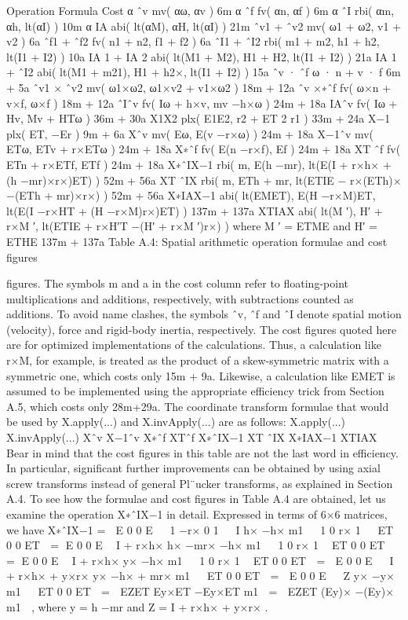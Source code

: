Operation Formula Cost α ˆv mv( αω, αv ) 6m α ˆf fv( αn, αf ) 6m α ˆI rbi( αm, αh, lt(αI) ) 10m α IA abi( lt(αM), αH, lt(αI) ) 21m ˆv1 + ˆv2 mv( ω1 + ω2, v1 + v2 ) 6a ˆf1 + ˆf2 fv( n1 + n2, f1 + f2 ) 6a ˆI1 + ˆI2 rbi( m1 + m2, h1 + h2, lt(I1 + I2) ) 10a IA 1 + IA 2 abi( lt(M1 + M2), H1 + H2, lt(I1 + I2) ) 21a IA 1 + ˆI2 abi( lt(M1 + m21), H1 + h2×, lt(I1 + I2) ) 15a ˆv · ˆf ω · n + v · f 6m + 5a ˆv1 × ˆv2 mv( ω1×ω2, ω1×v2 + v1×ω2 ) 18m + 12a ˆv ×∗ˆf fv( ω×n + v×f, ω×f ) 18m + 12a ˆIˆv fv( Iω + h×v, mv −h×ω ) 24m + 18a IAˆv fv( Iω + Hv, Mv + HTω ) 36m + 30a X1X2 plx( E1E2, r2 + ET 2 r1 ) 33m + 24a X−1 plx( ET, −Er ) 9m + 6a Xˆv mv( Eω, E(v −r×ω) ) 24m + 18a X−1ˆv mv( ETω, ETv + r×ETω ) 24m + 18a X∗ˆf fv( E(n −r×f), Ef ) 24m + 18a XT ˆf fv( ETn + r×ETf, ETf ) 24m + 18a X∗ˆIX−1 rbi( m, E(h −mr), lt(E(I + r×h× + (h −mr)×r×)ET) ) 52m + 56a XT ˆIX rbi( m, ETh + mr, lt(ETIE − r×(ETh)× −(ETh + mr)×r×) ) 52m + 56a X∗IAX−1 abi( lt(EMET), E(H −r×M)ET, lt(E(I −r×HT + (H −r×M)r×)ET) ) 137m + 137a XTIAX abi( lt(M ′), H′ + r×M ′, lt(ETIE + r×H′T −(H′ + r×M ′)r×) ) where M ′ = ETME and H′ = ETHE 137m + 137a Table A.4: Spatial arithmetic operation formulae and cost figures

figures. The symbols m and a in the cost column refer to floating-point multiplications and additions, respectively, with subtractions counted as additions. To avoid name clashes, the symbols ˆv, ˆf and ˆI denote spatial motion (velocity), force and rigid-body inertia, respectively. The cost figures quoted here are for optimized implementations of the calculations. Thus, a calculation like r×M, for example, is treated as the product of a skew-symmetric matrix with a symmetric one, which costs only 15m + 9a. Likewise, a calculation like EMET is assumed to be implemented using the appropriate efficiency trick from Section A.5, which costs only 28m+29a. The coordinate transform formulae that would be used by X.apply(...) and X.invApply(...) are as follows: X.apply(...) X.invApply(...) Xˆv X−1ˆv X∗ˆf XTˆf X∗ˆIX−1 XT ˆIX X∗IAX−1 XTIAX Bear in mind that the cost figures in this table are not the last word in efficiency. In particular, significant further improvements can be obtained by using axial screw transforms instead of general Pl¨ucker transforms, as explained in Section A.4. To see how the formulae and cost figures in Table A.4 are obtained, let us examine the operation X∗ˆIX−1 in detail. Expressed in terms of 6×6 matrices, we have X∗ˆIX−1 =  E 0 0 E   1 −r× 0 1   I h× −h× m1   1 0 r× 1   ET 0 0 ET  = E 0 0 E  I + r×h× h× −mr× −h× m1   1 0 r× 1  ET 0 0 ET  = E 0 0 E  I + r×h× y× −h× m1   1 0 r× 1  ET 0 0 ET  =  E 0 0 E   I + r×h× + y×r× y× −h× + mr× m1   ET 0 0 ET  =  E 0 0 E   Z y× −y× m1   ET 0 0 ET  =  EZET Ey×ET −Ey×ET m1  =  EZET (Ey)× −(Ey)× m1  , where y = h −mr and Z = I + r×h× + y×r× .

